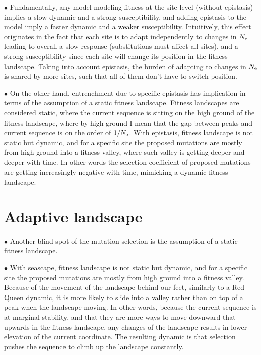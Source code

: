 $\bullet$ Fundamentally, any model modeling fitness at the site level (without epistasis) implies a slow dynamic and a strong susceptibility, and adding epistasis to the model imply a faster dynamic and a weaker susceptibility.
Intuitively, this effect originates in the fact that each site is to adapt independently to changes in $N_{\textrm{e}}$ leading to overall a slow response (substitutions must affect all sites), and a strong susceptibility since each site will change its position in the fitness landscape.
Taking into account epistasis, the burden of adapting to changes in $N_{\textrm{e}}$ is shared by more sites, such that all of them don't have to switch position.

$\bullet$ On the other hand, entrenchment due to specific epistasis has implication in terms of the assumption of a static fitness landscape.
Fitness landscapes are considered static, where the current sequence is sitting on the high ground of the fitness landscape, where by high ground I mean that the gap between peaks and current sequence is on the order of $1 / N_{\textrm{e}}$.
With epistasis, fitness landscape is not static but dynamic, and for a specific site the proposed mutations are mostly from high ground into a fitness valley, where such valley is getting deeper and deeper with time.
In other words the selection coefficient of proposed mutations are getting increasingly negative with time, mimicking a dynamic fitness landscape.

\section{Adaptive landscape}
\label{sec:adaptative-landscape}

$\bullet$ Another blind spot of the mutation-selection is the assumption of a static fitness landscape.

$\bullet$ With seascape, fitness landscape is not static but dynamic, and for a specific site the proposed mutations are mostly from high ground into a fitness valley.
Because of the movement of the landscape behind our feet, similarly to a Red-Queen dynamic, it is more likely to slide into a valley rather than on top of a peak when the landscape moving.
In other words, because the current sequence is at marginal stability, and that they are more ways to move downward that upwards in the fitness landscape, any changes of the landscape results in lower elevation of the current coordinate. The resulting dynamic is that selection pushes the sequence to climb up the landscape constantly.

